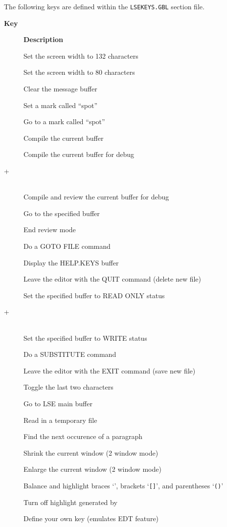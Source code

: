 The following keys are defined within the {\tt LSEKEYS.GBL}
section file.
\def\descriptionlabel#1{\rm #1\ \hfil}
\renewcommand{\thefootnote}[0]{\fnsymbol{footnote}}
\begin{small}
\begin{description}
\item[\bf Key] {\bf Description}
\item[\gold {\tt [}] Set the screen width to 132 characters
\item[\gold {\tt ]}] Set the screen width to 80 characters
\item[\gold {\tt \bs}] Clear the message buffer
\item[] Set a mark called ``spot''
\item[\gold {\tt \tlde}] Go to a mark called ``spot''
\item[] Compile the current buffer
\item[]   Compile the current buffer for debug \footnotemark[1]
\item[\gold + ]  \mbox{} \\
Compile and review the current buffer for
debug\footnotemark[1]
\item[] Go to the specified buffer
\item[] End review mode
\item[] Do a GOTO FILE command
\item[] Display the HELP.KEYS buffer
\item[] Leave the editor with the QUIT command (delete new file)
\item[] Set the specified buffer to READ ONLY status
\item[\gold + ]  \mbox{} \\ Set the specified buffer to WRITE status
\item[] Do a SUBSTITUTE command
\item[] Leave the editor with the EXIT command (save new file)
\item[] Toggle the last two characters
\item[] Go to LSE main buffer
\item[] Read in a temporary file
\item[] Find the next occurence of a paragraph
\item[\gold {\tt <}] Shrink the current window (2 window mode)
\item[\gold {\tt >}] Enlarge the current window (2 window mode)
\item[\gold {\tt \lb}] Balance and highlight braces `{\tt \lb \rb}', brackets
`{\tt []}', and parentheses `{\tt ()}'
\item[\gold {\tt \rb}] Turn off highlight generated by \gold {\tt \lb}
\item[] Define your own key (emulates EDT  feature)
\end{description}
\end{small}

